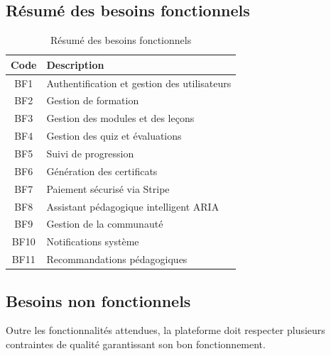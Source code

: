 \documentclass[12pt, a4paper]{report}
\begin{document}
\subsection{Résumé des besoins fonctionnels}

\begin{table}[H]
\centering
\caption{Résumé des besoins fonctionnels}
\label{tab:besoins_fonctionnels}
\begin{tabularx}{\textwidth}{|c|X|}
\hline
\textbf{Code} & \textbf{Description} \\
\hline
BF1 & Authentification et gestion des utilisateurs \\
\hline
BF2 & Gestion de formation \\
\hline
BF3 & Gestion des modules et des leçons \\
\hline
BF4 & Gestion des quiz et évaluations \\
\hline
BF5 & Suivi de progression \\
\hline
BF6 & Génération des certificats \\
\hline
BF7 & Paiement sécurisé via Stripe \\
\hline
BF8 & Assistant pédagogique intelligent ARIA \\
\hline
BF9 & Gestion de la communauté \\
\hline
BF10 & Notifications système \\
\hline
BF11 & Recommandations pédagogiques \\
\hline
\end{tabularx}
\end{table}

\subsection{Besoins non fonctionnels}

Outre les fonctionnalités attendues, la plateforme doit respecter plusieurs
contraintes de qualité garantissant son bon fonctionnement.
\end{document}
